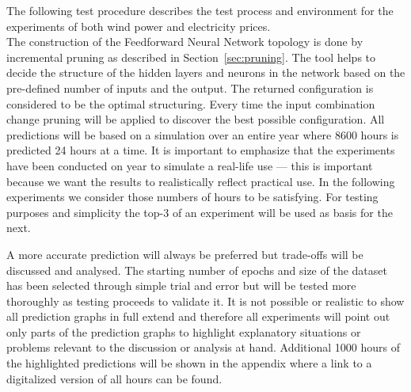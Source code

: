 The following test procedure describes the test process and environment for the experiments of both wind power and electricity prices. 
\\[0.5cm]
The construction of the Feedforward Neural Network topology is done by incremental pruning as described in Section~\ref{sec:pruning}. The tool helps to decide the structure of the hidden layers and neurons in the network based on the pre-defined number of inputs and the output. The returned configuration is considered to be the optimal structuring. Every time the input combination change pruning will be applied to discover the best possible configuration. All predictions will be based on a simulation over an entire year where 8600 hours is predicted 24 hours at a time. It is important to emphasize that the experiments have been conducted on year to simulate a real-life use --- this is important because we want the results to realistically reflect practical use. In the following experiments we consider those numbers of hours to be satisfying. For testing purposes and simplicity the top-3 of an experiment will be used as basis for the next. 

A more accurate prediction will always be preferred but trade-offs will be discussed and analysed. The starting number of epochs and size of the dataset has been selected through simple trial and error but will be tested more thoroughly as testing proceeds to validate it. It is not possible or realistic to show all prediction graphs in full extend and therefore all experiments will point out only parts of the prediction graphs to highlight explanatory situations or problems relevant to the discussion or analysis at hand. Additional 1000 hours of the highlighted predictions will be shown in the appendix where a link to a digitalized version of all hours can be found. 

